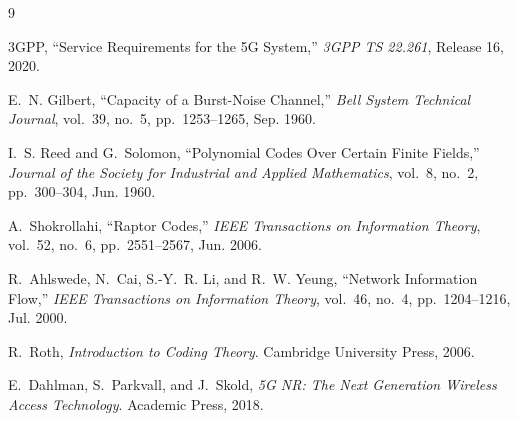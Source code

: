 \documentclass[conference]{IEEEtran}
\begin{document}
\begin{thebibliography}{9}

3GPP, ``Service Requirements for the 5G System,''
\textit{3GPP TS 22.261}, Release 16, 2020.

E.~N. Gilbert, ``Capacity of a Burst-Noise Channel,''
\textit{Bell System Technical Journal}, vol.~39, no.~5,
pp.~1253--1265, Sep. 1960.

I.~S. Reed and G.~Solomon, ``Polynomial Codes Over Certain Finite Fields,''
\textit{Journal of the Society for Industrial and Applied Mathematics},
vol.~8, no.~2, pp.~300--304, Jun. 1960.

A.~Shokrollahi, ``Raptor Codes,''
\textit{IEEE Transactions on Information Theory},
vol.~52, no.~6, pp.~2551--2567, Jun. 2006.

R.~Ahlswede, N.~Cai, S.-Y.~R. Li, and R.~W. Yeung,
``Network Information Flow,''
\textit{IEEE Transactions on Information Theory},
vol.~46, no.~4, pp.~1204--1216, Jul. 2000.

R.~Roth, \textit{Introduction to Coding Theory}.
Cambridge University Press, 2006.

E.~Dahlman, S.~Parkvall, and J.~Skold,
\textit{5G NR: The Next Generation Wireless Access Technology}.
Academic Press, 2018.

\end{thebibliography}
\end{document}
